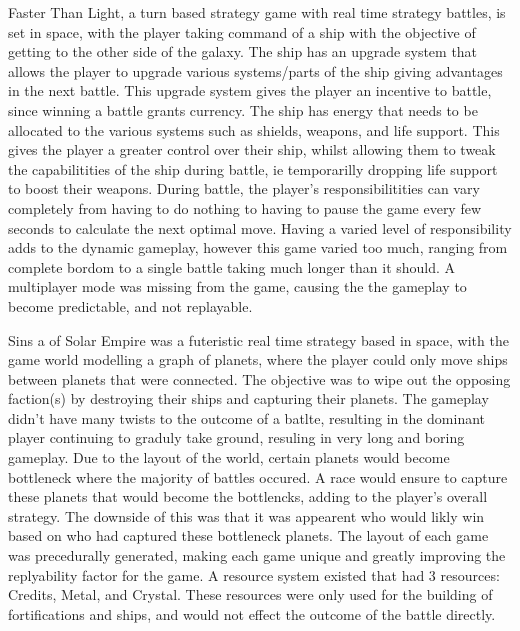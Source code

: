 Faster Than Light, a turn based strategy game with real time strategy battles, is set in space, with the player taking command of a ship with the objective of getting to the other side of the galaxy.
The ship has an upgrade system that allows the player to upgrade various systems/parts of the ship giving advantages in the next battle.
This upgrade system gives the player an incentive to battle, since winning a battle grants currency.
The ship has energy that needs to be allocated to the various systems such as shields, weapons, and life support.
This gives the player a greater control over their ship, whilst allowing them to tweak the capabilitities of the ship during battle, ie temporarilly dropping life support to boost their weapons.
During battle, the player's responsibilitities can vary completely from having to do nothing to having to pause the game every few seconds to calculate the next optimal move. Having a varied level of responsibility adds to the dynamic gameplay, however this game varied too much, ranging from complete bordom to a single battle taking much longer than it should.
A multiplayer mode was missing from the game, causing the the gameplay to become predictable, and not replayable.


Sins a of Solar Empire was a futeristic real time strategy based in space, with the game world modelling a graph of planets, where the player could only move ships between planets that were connected. 
The objective was to wipe out the opposing faction(s) by destroying their ships and capturing their planets.
The gameplay didn't have many twists to the outcome of a batlte, resulting in the dominant player continuing to graduly take ground, resuling in very long and boring gameplay.
Due to the layout of the world, certain planets would become bottleneck where the majority of battles occured. 
A race would ensure to capture these planets that would become the bottlencks, adding to the player's overall strategy.
The downside of this was that it was appearent who would likly win based on who had captured these bottleneck planets.
The layout of each game was precedurally generated, making each game unique and greatly improving the replyability factor for the game.
A resource system existed that had 3 resources: Credits, Metal, and Crystal. 
These resources were only used for the building of fortifications and ships, and would not effect the outcome of the battle directly.


